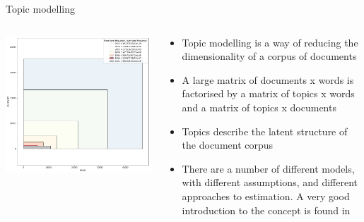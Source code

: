 \documentclass[9pt]{beamer}
\begin{document}
\begin{frame}{Topic modelling}

\begin{columns}
	\begin{column}{0.5\linewidth}
		\begin{center}
			\includegraphics[width=\linewidth]{images/volume_variety_bible.png}
		\end{center}
	\end{column}
	\begin{column}{0.5\linewidth}
		\begin{center}
			\begin{itemize}
				\item Topic modelling is a way of reducing the dimensionality of a corpus of documents
				\item A large matrix of documents x words is factorised by
				a matrix of topics x words and a matrix of topics x documents
				\citep{Lee1999}
				\item Topics describe the latent structure of the document corpus
				\item There are a number of different models, with different assumptions, and different approaches to estimation. A very good introduction to the concept is found in \citet{Blei2012}
			\end{itemize}
		\end{center}
	\end{column}
\end{columns}

\end{frame}
\end{document}
